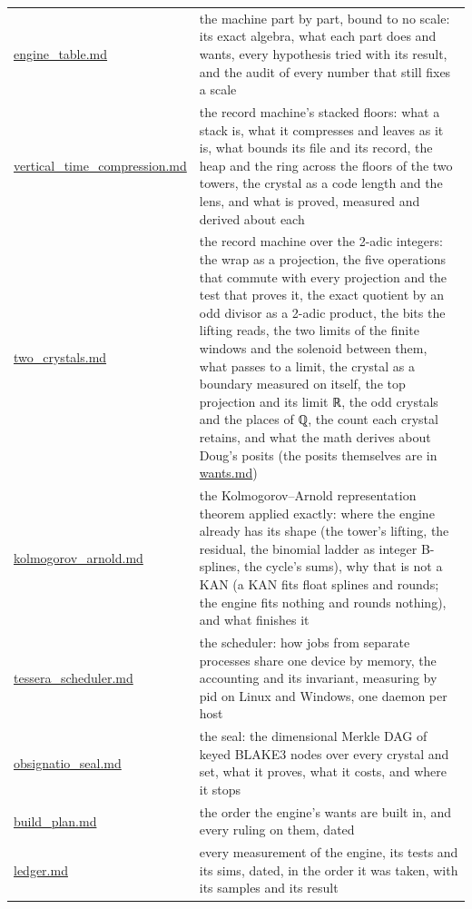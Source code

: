 {\begin{longtable}{>{\RaggedRight\arraybackslash}p{}>{\RaggedRight\arraybackslash}p{}}
\hyperref[chap:engine-table]{engine\_\allowbreak{}table.md} & the machine part by part, bound to no scale: its exact algebra, what each part does and wants, every hypothesis tried with its result, and the audit of every number that still fixes a scale \\
\hyperref[chap:vertical-time-compression]{vertical\_\allowbreak{}time\_\allowbreak{}compression.md} & the record machine's stacked floors: what a stack is, what it compresses and leaves as it is, what bounds its file and its record, the heap and the ring across the floors of the two towers, the crystal as a code length and the lens, and what is proved, measured and derived about each \\
\hyperref[chap:two-crystals]{two\_\allowbreak{}crystals.md} & the record machine over the 2-adic integers: the wrap as a projection, the five operations that commute with every projection and the test that proves it, the exact quotient by an odd divisor as a 2-adic product, the bits the lifting reads, the two limits of the finite windows and the solenoid between them, what passes to a limit, the crystal as a boundary measured on itself, the top projection and its limit ℝ, the odd crystals and the places of ℚ, the count each crystal retains, and what the math derives about Doug's posits (the posits themselves are in \hyperref[chap:wants]{wants.md}) \\
\hyperref[chap:kolmogorov-arnold]{kolmogorov\_\allowbreak{}arnold.md} & the Kolmogorov–Arnold representation theorem applied exactly: where the engine already has its shape (the tower's lifting, the residual, the binomial ladder as integer B-splines, the cycle's sums), why that is not a KAN (a KAN fits float splines and rounds; the engine fits nothing and rounds nothing), and what finishes it \\
\hyperref[chap:tessera-scheduler]{tessera\_\allowbreak{}scheduler.md} & the scheduler: how jobs from separate processes share one device by memory, the accounting and its invariant, measuring by pid on Linux and Windows, one daemon per host \\
\hyperref[chap:obsignatio-seal]{obsignatio\_\allowbreak{}seal.md} & the seal: the dimensional Merkle DAG of keyed BLAKE3 nodes over every crystal and set, what it proves, what it costs, and where it stops \\
\hyperref[chap:build-plan]{build\_\allowbreak{}plan.md} & the order the engine's wants are built in, and every ruling on them, dated \\
\hyperref[chap:ledger]{ledger.md} & every measurement of the engine, its tests and its sims, dated, in the order it was taken, with its samples and its result \\

\end{longtable}}
